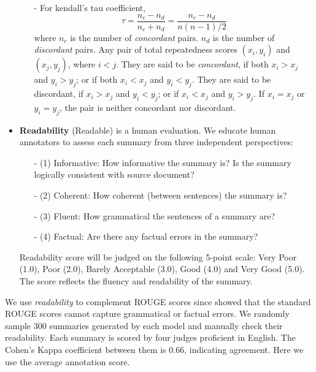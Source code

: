 \begin{itemize}
\begin{itemize}
\item[-] For kendall's tau coefficient,
\begin{equation}
\tau = \frac{n_c - n_d}{n_c + n_d} = \frac{n_c - n_d}{n(n-1)/2}
\end{equation}
where $n_c$ is the number of \textit{concordant} pairs.
$n_d$ is the number of \textit{discordant} pairs.
Any pair of total repeatedness scores $(x_{i},y_{i})$ and $(x_{j},y_{j})$, where $i<j$.
They are said to be \textit{concordant},
if both $x_{i}>x_{j}$ and $y_{i}>y_{j}$; or if both $x_{i}<x_{j}$ and $y_{i}<y_{j}$.
They are said to be discordant, if $x_{i}>x_{j}$ and $y_{i}<y_{j}$; 
or if $x_{i}<x_{j}$ and $y_{i}>y_{j}$. 
If $x_{i}=x_{j}$ or $y_{i}=y_{j}$, the pair is neither concordant nor discordant.
\end{itemize}


\item \textbf{Readability} (Readable) is a human evaluation. 
We educate human annotators to assess each summary
from three independent perspectives: 
\begin{itemize}
\item[-]
(1) Informative: How informative the summary is? 
Is the summary logically consistent with source document? 
\item[-]
(2) Coherent: How coherent (between sentences) the summary is? 
\item[-]
(3) Fluent: How grammatical the sentences of a summary are? 
\item[-]
(4) Factual: Are there any factual errors in the summary?
\end{itemize}
Readability score will be judged on the following 5-point scale:
Very Poor (1.0), Poor (2.0), Barely Acceptable (3.0), Good (4.0) and Very Good (5.0).
The score reflects the fluency and readability of the summary.
\end{itemize}

We use \textit{readability} to complement ROUGE scores 
since \cite{YaoWX17} showed that the standard 
ROUGE scores cannot capture grammatical or factual errors. 
We randomly sample 300 summaries generated by each model
and manually check their readability. 
Each summary is scored by four judges proficient in English. 
The Cohen's Kappa coefficient between them is $0.66$, 
indicating agreement. Here we use the average annotation score.

